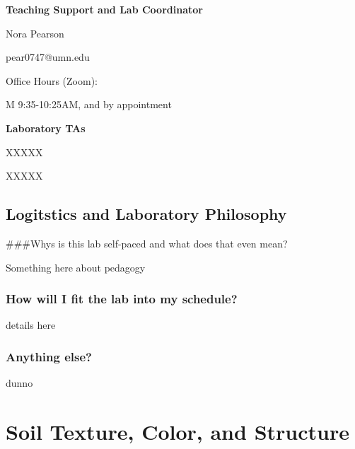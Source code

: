 \documentclass[
  letterpaper,
  twocolumn,
  portrait]{scrbook}
\begin{document}

\textbf{Teaching Support and Lab Coordinator}

Nora Pearson

pear0747@umn.edu

Office Hours (Zoom):

M 9:35-10:25AM, and by appointment

\textbf{Laboratory TAs}

XXXXX

XXXXX

\hypertarget{logitstics-and-laboratory-philosophy}{%
\section*{Logitstics and Laboratory
Philosophy}\label{logitstics-and-laboratory-philosophy}}


\#\#\#Whys is this lab self-paced and what does that even mean?

Something here about pedagogy

\hypertarget{how-will-i-fit-the-lab-into-my-schedule}{%
\subsection*{How will I fit the lab into my
schedule?}\label{how-will-i-fit-the-lab-into-my-schedule}}

details here

\hypertarget{anything-else}{%
\subsection*{Anything else?}\label{anything-else}}

dunno


\hypertarget{soil-texture-color-and-structure}{%
\chapter{\texorpdfstring{\textbf{Soil Texture, Color, and
Structure}}{Soil Texture, Color, and Structure}}\label{soil-texture-color-and-structure}}
\end{document}
